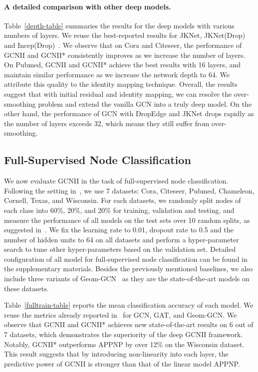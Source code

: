 \documentclass{article}
\begin{document}
\paragraph{A detailed comparison with other deep models.}
Table~\ref{depth-table} summaries the results for the deep models with
various numbers of layers. We reuse the best-reported results for JKNet,
JKNet(Drop) and
Incep(Drop)~.
We observe that on Cora and Citeseer, the performance of  GCNII and GCNII* consistently
improves as we increase the number of layers. On Pubmed, GCNII and GCNII* achieve
the best results with 16 layers, and maintain similar performance as
we increase the network depth to 64. We attribute this quality to the
identity mapping technique. Overall, the results suggest
that with initial residual and identity mapping, we can resolve the 
over-smoothing problem and extend the vanilla GCN into a truly deep model. 
On the other hand, the
performance of GCN
with DropEdge and JKNet drops rapidly as the number of layers exceeds 32,
which means they still suffer from over-smoothing. 

\subsection{Full-Supervised Node Classification}
We now evaluate GCNII in the task of full-supervised node
classification.  Following the setting in~\cite{Pei2020GeomGCN}, we
use 7 datasets: Cora, Citeseer, Pubmed, Chameleon, Cornell, Texas, and
Wisconsin.
For each datasets, we randomly split
nodes of each class into 60\%, 20\%, and 20\% for training, validation
and testing, and measure the performance of
all models on the test sets over 10 random splits, as suggested in~\cite{Pei2020GeomGCN}.
We
fix the learning rate to 0.01, dropout rate to 0.5 and the number of hidden units to 64 on all
datasets and perform a hyper-parameter search to tune other
hyper-parameters based on the validation set. Detailed configuration of all model
for full-supervised node classification can be found in the
supplementary materials.
Besides the
previously mentioned baselines, we also include three variants
of Geom-GCN~\cite{Pei2020GeomGCN} as they are the state-of-the-art
models on these datasets. 


Table~\ref{fulltrain-table} reports the mean classification accuracy
of each model. We reuse the
metrics already reported in~\cite{Pei2020GeomGCN} for GCN, GAT, and
Geom-GCN.
We observe that GCNII and GCNII* achieves new state-of-the-art results
on 6 out of 7 datasets, which demonstrates the superiority of the deep
GCNII framework. Notably, GCNII* outperforms APPNP by over 12\% on the
Wisconsin dataset. This result suggests that by introducing
non-linearity into each layer, the predictive power of GCNII is
stronger than that of the linear model APPNP.
\end{document}
